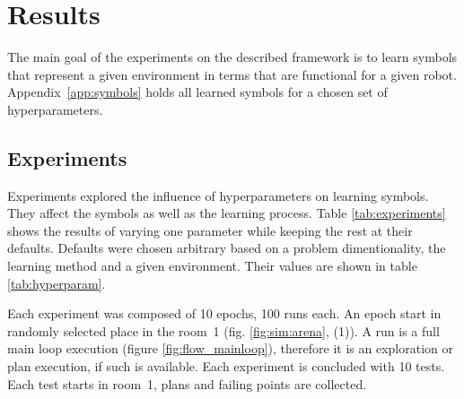 \section{Results} \label{chapter:results}

The main goal of the experiments on the described framework is to learn symbols that represent a given environment in terms that are functional for a given robot. Appendix~\ref{app:symbols} holds all learned symbols for a chosen set of hyperparameters.

\subsection{Experiments}

Experiments explored the influence of hyperparameters on learning symbols. They affect the symbols as well as the learning process. Table \ref{tab:experiments} shows the results of varying one parameter while keeping the rest at their defaults. Defaults were chosen arbitrary based on a problem dimentionality, the learning method and a given environment. Their values are shown in table \ref{tab:hyperparam}. 

Each experiment was composed of 10 epochs, 100 runs each. An epoch start in randomly selected place in the room~1 (fig. \ref{fig:sim:arena}, (1)). A run is a full main loop execution (figure \ref{fig:flow_mainloop}), therefore it is an exploration or plan execution, if such is available. Each experiment is concluded with 10 tests. Each test starts in room~1, plans and failing points are collected. 

